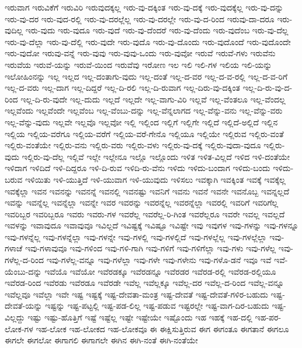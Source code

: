 {ಇರುವಾಗ
ಇರುವಿಕೆಗೆ
ಇರುವಿರಿ
ಇರುವುದಕ್ಕಲ್ಲ
ಇರು-ವು-ದಕ್ಕಿಂತ
ಇರು-ವು-ದಕ್ಕೆ
ಇರು-ವುದಕ್ಕೆಲ್ಲ
ಇರು-ವು-ದನ್ನು
ಇರು-ವು-ದರ
ಇರು-ವುದ-ರಲ್ಲಿ
ಇರು-ವು-ದರಲ್ಲೆಲ್ಲ
ಇರು-ವು-ದರಲ್ಲೇ
ಇರು-ವು-ದ-ರಿಂದ
ಇರುವು-ದಾ-ದರೂ
ಇರು-ವುದಿಲ್ಲ
ಇರು-ವುದು
ಇರು-ವುದೂ
ಇರು-ವುದೆ
ಇರು-ವು-ದೆಂದರೆ
ಇರು-ವು-ದೆಂದು
ಇರು-ವುದೆಂಬ
ಇರು-ವು-ದೆಲ್ಲ
ಇರು-ವು-ದೆಲ್ಲಾ
ಇರು-ವು-ದೆಲ್ಲಿ
ಇರು-ವುದೇ
ಇರು-ವುದೊ
ಇರು-ವು-ದೊಂದು
ಇರು-ವುದೊಂದೆ
ಇರು-ವುದೊಂದೇ
ಇರು-ವುದೋ
ಇರುವು-ವನ್ನೆ
ಇರು-ವುವು
ಇರು-ವುವು-ಒಂದು
ಇರು-ವುವೋ
ಇರುವೆ
ಇರುವೆ-ಗಳು
ಇರುವೆನು
ಇರುವೆಯ
ಇರುವೆ-ಯನ್ನು
ಇರುವೆ-ಯಿಂದ
ಇರುವೆವು
ಇರೋಣ
ಇಲ
ಇಲಿ
ಇಲಿ-ಗಳ
ಇಲಿಯ
ಇಲಿ-ಯನ್ನು
ಇಲೋಹಿಂನನ್ನು
ಇಲ್ಲ
ಇಲ್ಲದ
ಇಲ್ಲ-ದಂತಾಗು-ವುದು
ಇಲ್ಲ-ದಂತೆ
ಇಲ್ಲ-ದ-ವರ
ಇಲ್ಲ-ದ-ವ-ರಲ್ಲಿ
ಇಲ್ಲ-ದ-ವ-ರಿಗೆ
ಇಲ್ಲ-ದ-ವರು
ಇಲ್ಲ-ದಾಗ
ಇಲ್ಲ-ದಿದ್ದರೆ
ಇಲ್ಲ-ದಿ-ರಲಿ
ಇಲ್ಲ-ದಿ-ರುವಾಗ
ಇಲ್ಲ-ದಿರು-ವು-ದಕ್ಕಿಂತ
ಇಲ್ಲ-ದಿ-ರು-ವು-ದ-ರಿಂದ
ಇಲ್ಲ-ದಿ-ರು-ವುದೇ
ಇಲ್ಲ-ದುದು
ಇಲ್ಲದೆ
ಇಲ್ಲದೇ
ಇಲ್ಲ-ವಾಗು-ವಿರಿ
ಇಲ್ಲವೆ
ಇಲ್ಲ-ವೆಂತಲೂ
ಇಲ್ಲ-ವೆಂದಲ್ಲ
ಇಲ್ಲವೆಂದು
ಇಲ್ಲವೆಂದೇ
ಇಲ್ಲವೆಂಬ
ಇಲ್ಲ-ವೆಂಬು-ದನ್ನು
ಇಲ್ಲ-ವೆನ್ನಲಾಗದ
ಇಲ್ಲ-ವೆನ್ನು-ವನು
ಇಲ್ಲ-ವೆನ್ನು-ವರು
ಇಲ್ಲ-ವೆನ್ನು-ವುದು
ಇಲ್ಲವೇ
ಇಲ್ಲವೊ
ಇಲ್ಲವೋ
ಇಲ್ಲಿ
ಇಲ್ಲಿಂದ
ಇಲ್ಲಿಗೆ
ಇಲ್ಲಿಗೇ
ಇಲ್ಲಿದೆ
ಇಲ್ಲಿದೆ-ಅಲ್ಲಿದೆ
ಇಲ್ಲಿನ
ಇಲ್ಲಿಯ
ಇಲ್ಲಿಯ-ವರೆಗೂ
ಇಲ್ಲಿಯ-ವರೆಗೆ
ಇಲ್ಲಿಯ-ವರೆ-ಗೇನೊ
ಇಲ್ಲಿಯೂ
ಇಲ್ಲಿಯೇ
ಇಲ್ಲಿರುವ
ಇಲ್ಲಿರು-ವಂತೆ
ಇಲ್ಲಿರು-ವಂತೆಯೇ
ಇಲ್ಲಿರು-ವನು
ಇಲ್ಲಿರು-ವರು
ಇಲ್ಲಿರು-ವಳು
ಇಲ್ಲಿರು-ವು-ದಕ್ಕೆ
ಇಲ್ಲಿರು-ವುದಾ-ವುದೂ
ಇಲ್ಲಿರು-ವುದು
ಇಲ್ಲಿರು-ವು-ದೆಲ್ಲ
ಇಲ್ಲಿವೆ
ಇಲ್ಲೇ
ಇಲ್ಲೇನೂ
ಇಲ್ಲೊ
ಇಲ್ಲೊಂದು
ಇಳಿತ
ಇಳಿತ-ವಿಲ್ಲದೆ
ಇಳಿದ
ಇಳಿ-ದಂತೆಯೇ
ಇಳಿದಾಗ
ಇಳಿದಿದೆ
ಇಳಿ-ದಿದ್ದರೂ
ಇಳಿ-ದಿ-ರುವ
ಇಳಿದಿ-ರು-ವೆನು
ಇಳಿದು
ಇಳಿದು-ಬಂದಾಗ
ಇಳಿದು-ಬಂದು
ಇಳಿದು-ಬರುವ
ಇಳಿಯಿತು
ಇಳಿ-ಯುತ್ತಿದೆ
ಇಳಿ-ಯುವಾಗ
ಇಳಿ-ಯುವುದು
ಇಳಿಸಲು
ಇವಕ್ಕಾಗಿ
ಇವಕ್ಕಿಂತ
ಇವಕ್ಕೆ
ಇವಕ್ಕೆಲ್ಲ
ಇವಕ್ಕೆಲ್ಲಾ
ಇವನ
ಇವನನ್ನು
ಇವನನ್ನೆ
ಇವನಲ್ಲಿ
ಇವನಷ್ಟು
ಇವನಿಗೆ
ಇವನು
ಇವನೆ
ಇವನೇ
ಇವನೊಬ್ಬ
ಇವನ್ನಲ್ಲದೆ
ಇವನ್ನು
ಇವನ್ನೆಲ್ಲ
ಇವನ್ನೆಲ್ಲಾ
ಇವನ್ನೇ
ಇವರ
ಇವರನ್ನು
ಇವರನ್ನೆಲ್ಲ
ಇವರನ್ನೆಲ್ಲಾ
ಇವರಲ್ಲಿ
ಇವರಿಗೆ
ಇವರಿಗೆಲ್ಲ
ಇವರಿಬ್ಬರ
ಇವರಿಬ್ಬರೂ
ಇವರು
ಇವರು-ಗಳ
ಇವರೆಲ್ಲ
ಇವರೆಲ್ಲ-ರಿ-ಗಿಂತ
ಇವರೆಲ್ಲರೂ
ಇವರೇ
ಇವಲ್ಲ
ಇವಲ್ಲದೆ
ಇವಳನ್ನು
ಇವಾವುದೂ
ಇವಾವುವೂ
ಇವಿಲ್ಲದೆ
ಇವಿಷ್ಟಕ್ಕೆ
ಇವಿಷ್ಟೂ
ಇವಿಷ್ಟೇ
ಇವು
ಇವುಗಳ
ಇವು-ಗಳನ್ನು
ಇವು-ಗಳನ್ನೂ
ಇವು-ಗಳನ್ನೆಲ್ಲ
ಇವು-ಗಳನ್ನೆಲ್ಲಾ
ಇವು-ಗಳನ್ನೇ
ಇವು-ಗಳಲ್ಲಿ
ಇವು-ಗಳಲ್ಲಿದೆ
ಇವು-ಗಳಲ್ಲೆಲ್ಲ
ಇವು-ಗಳಲ್ಲೆಲ್ಲಾ
ಇವು-ಗಳಾಚೆ
ಇವು-ಗಳಾವುವೂ
ಇವು-ಗಳಿಂದ
ಇವು-ಗಳಿ-ಗಾಗಿ
ಇವು-ಗಳಿಗೆ
ಇವು-ಗಳಿಗೆಲ್ಲಾ
ಇವು-ಗಳು
ಇವು-ಗಳೆಲ್ಲ
ಇವು-ಗಳೆಲ್ಲ-ದ-ರಿಂದ
ಇವು-ಗಳೆಲ್ಲ-ವನ್ನೂ
ಇವು-ಗಳೆಲ್ಲಾ
ಇವು-ಗಳೇ
ಇವು-ಗಳೇನು
ಇವು-ಗಳೊ-ಡನೆ
ಇವೂ
ಇವೆ
ಇವೆ-ಯೆಂಬು-ದನ್ನು
ಇವೆಯೊ
ಇವೆಯೋ
ಇವೆರಡಕ್ಕೂ
ಇವೆರಡನ್ನೂ
ಇವೆರಡರ
ಇವೆರಡ-ರಲ್ಲಿ
ಇವೆರಡ-ರಲ್ಲಿಯೂ
ಇವೆರಡ-ರಿಂದ
ಇವೆರಡು
ಇವೆರಡೂ
ಇವೆರಡೇ
ಇವೆಲ್ಲ
ಇವೆಲ್ಲಕ್ಕೂ
ಇವೆಲ್ಲ-ದರ
ಇವೆಲ್ಲ-ದ-ರಿಂದ
ಇವೆಲ್ಲ-ವನ್ನೂ
ಇವೆಲ್ಲವೂ
ಇವೆಲ್ಲಾ
ಇವೇ
ಇಷ್ಟ
ಇಷ್ಟಕ್ಕೆ
ಇಷ್ಟ-ದೇವತಾ-ಮಂತ್ರ
ಇಷ್ಟ-ದೇವತೆ
ಇಷ್ಟ-ದೇವತೆ-ಗಳಿರ-ಬಹುದು
ಇಷ್ಟ-ದೇವತೆ-ಯನ್ನು
ಇಷ್ಟನ್ನು
ಇಷ್ಟ-ಪಟ್ಟಲ್ಲಿ
ಇಷ್ಟ-ಪಡ-ಲಿಲ್ಲ
ಇಷ್ಟ-ಪಡುವ
ಇಷ್ಟರಲ್ಲೇ
ಇಷ್ಟ-ವಾಗ-ದಿರ-ಬಹುದು
ಇಷ್ಟ-ವಿಲ್ಲದ್ದು
ಇಷ್ಟು
ಇಷ್ಟು-ಹೊತ್ತಿಗೆ
ಇಷ್ಟೆ
ಇಷ್ಟೆಲ್ಲ
ಇಷ್ಟೇ
ಇಷ್ಟೇಯೇ
ಇಷ್ಟೊಂದು
ಇಹ
ಇಹಕ್ಕೆ
ಇಹ-ದಲ್ಲಿ
ಇಹ-ಪರ-ಲೋಕ-ಗಳ
ಇಹ-ಲೋಕ
ಇಹ-ಲೋಕದ
ಇಹ-ಲೋಕವೂ
ಈ
ಈಕ್ಷಿಸುತ್ತಿರುವ
ಈಗ
ಈಗಂತೂ
ಈಗತಾನೆ
ಈಗಲೂ
ಈಗಲೇ
ಈಗಲೋ
ಈಗಾಗಲಿ
ಈಗಾಗಲೇ
ಈಗಿನ
ಈಗಿ-ನಂತೆ
ಈಗಿ-ನಂತೆಯೇ
}
